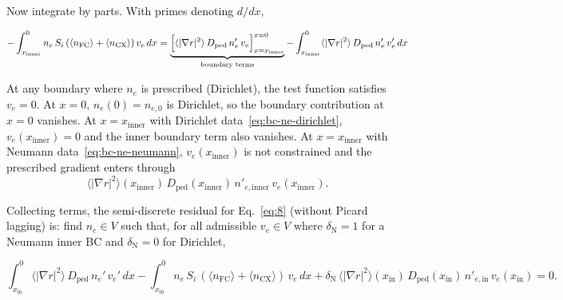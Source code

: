 \documentclass[twocolumn,secnumarabic,amssymb, nobibnotes, aps, prd]{revtex4-2}
\begin{document}
Now integrate by parts.
With primes denoting $d/dx$,
\begin{widetext}
\begin{align}
  -\int_{x_{\mathrm{inner}}}^{0} n_e\,S_i\,(\langle n_{\mathrm{FC}}\rangle + \langle n_{\mathrm{CX}}\rangle)\, v_e \, dx =   \underbrace{\Bigl[\langle|\nabla r|^{2}\rangle\,D_{\mathrm{ped}}\,n_e'\, v_e\Bigr]_{x=x_{\mathrm{inner}}}^{x=0}}_{\text{boundary terms}}
  - \int_{x_{\mathrm{inner}}}^{0} \langle|\nabla r|^{2}\rangle\,D_{\mathrm{ped}}\,n_e'\, v_e' \, dx
  \label{eq:ne-ibp}
\end{align}
\end{widetext}

At any boundary where $n_e$ is prescribed (Dirichlet), the test function satisfies $v_e=0$.
At $x=0$, $n_e(0)=n_{e,0}$ is Dirichlet, so the boundary contribution at $x=0$ vanishes.
At $x=x_{\mathrm{inner}}$ with Dirichlet data~\eqref{eq:bc-ne-dirichlet}, $v_e(x_{\mathrm{inner}})=0$ and the inner boundary term also vanishes.
At $x=x_{\mathrm{inner}}$ with Neumann data~\eqref{eq:bc-ne-neumann},
$v_e(x_{\mathrm{inner}})$ is not constrained and the prescribed gradient
enters through
\begin{equation}
  \langle|\nabla r|^{2}\rangle(x_{\mathrm{inner}})\,D_{\mathrm{ped}}(x_{\mathrm{inner}})\,n'_{e,\mathrm{inner}}\, v_e(x_{\mathrm{inner}}).
  \label{eq:ne-neumann-natural}
\end{equation}

Collecting terms, the semi-discrete residual for Eq.~\eqref{eq:8}
(without Picard lagging) is: find $n_e \in V$ such that, for all admissible
$v_e \in V$ where $\delta_{\mathrm{N}}=1$ for a Neumann inner BC and
$\delta_{\mathrm{N}}=0$ for Dirichlet, 
\begin{widetext}
\begin{equation}
  \int_{x_{\mathrm{in}}}^{0} \langle|\nabla r|^{2}\rangle\,D_{\mathrm{ped}}\,n_e'\, v_e' \, dx
  - \int_{x_{\mathrm{in}}}^{0} n_e\,S_i\,(\langle n_{\mathrm{FC}}\rangle + \langle n_{\mathrm{CX}}\rangle)\, v_e \, dx
  + \delta_{\mathrm{N}}\,
    \langle|\nabla r|^{2}\rangle(x_{\mathrm{in}})\,D_{\mathrm{ped}}(x_{\mathrm{in}})\,n'_{e,\mathrm{in}}\, v_e(x_{\mathrm{in}})
  = 0.
  \label{eq:weak-ne}
\end{equation}
\end{widetext}
\end{document}
